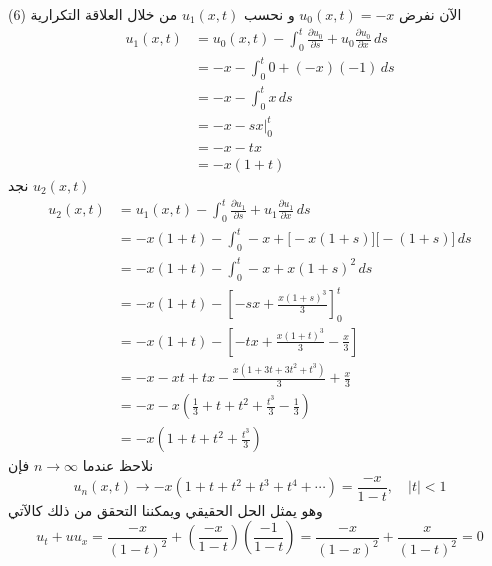 الآن نفرض $u_0(x,t) = -x$ و نحسب $u_1(x, t)$ من خلال العلاقة التكرارية (6)
\begin{align*}
	u_1(x, t) &= u_0(x, t) - \int_{0}^t \frac{\partial u_0}{\partial s} + u_0 \frac{\partial u_0}{\partial x} \, ds\\
	&= -x - \int_{0}^t 0 + (-x)(-1) \, ds\\
	&= -x - \int_{0}^t x \, ds\\
	&= -x - sx \Big|_0^t\\
	&= -x -tx\\
	&= -x(1+t)
\end{align*}
نجد $u_2(x, t)$
\begin{align*}
	u_2(x, t) &= u_1(x, t) - \int_{0}^t \frac{\partial u_1}{\partial s} + u_1 \frac{\partial u_1}{\partial x} \, ds\\
	&= -x(1+t) - \int_{0}^t -x + \big[-x(1+s)\big]\big[-(1+s)\big]\, ds\\
	&= -x(1+t) - \int_{0}^t -x + x(1+s)^2\, ds\\
	&= -x(1+t) - \left[-sx + \frac{x(1+s)^3}{3}\right]_0^t\\
	&= -x(1+t) - \left[-tx + \frac{x(1+t)^3}{3} - \frac{x}{3}\right]\\
	&= -x -xt + tx - \frac{x(1+3t + 3t^2 + t^3)}{3} + \frac{x}{3}\\
	&= -x - x \left(\frac{1}{3} + t + t^2 + \frac{t^3}{3} - \frac{1}{3}\right) \\
	&= -x \left(1+t+t^2 + \frac{t^3}{3}\right)
\end{align*}
نلاحظ عندما $n \to \infty$ فإن 
\[
u_n(x ,t) \to -x (1+t+t^2+t^3+t^4 + \cdots) = \frac{-x}{1-t} , \quad |t| < 1
\]
وهو يمثل الحل الحقيقي ويمكننا التحقق من ذلك كالآتي
\[
u_t + u u_x = \frac{-x}{(1-t)^2} + \left(\frac{-x}{1-t}\right)\left(\frac{-1}{1-t}\right) = \frac{-x}{(1-x)^2} + \frac{x}{(1-t)^2} = 0
\]

